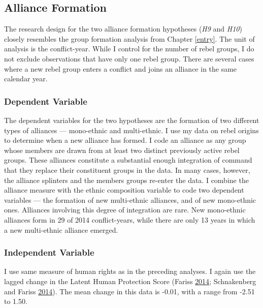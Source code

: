\documentclass[12pt,]{book}
\theoremstyle{definition}
\theoremstyle{definition}
\theoremstyle{definition}
\theoremstyle{remark}
\begin{document}
\hypertarget{alliance-formation-2}{%
\subsection{Alliance Formation}\label{alliance-formation-2}}

The research design for the two alliance formation hypotheses (\emph{H9}
and \emph{H10}) closely resembles the group formation analysis from
Chapter \ref{entry}. The unit of analysis is the conflict-year. While I
control for the number of rebel groups, I do not exclude observations
that have only one rebel group. There are several cases where a new
rebel group enters a conflict and joins an alliance in the same calendar
year.

\hypertarget{dependent-variable}{%
\subsubsection*{Dependent Variable}\label{dependent-variable}}

The dependent variables for the two hypotheses are the formation of two
different types of alliances --- mono-ethnic and multi-ethnic. I use my
data on rebel origins to determine when a new alliance has formed. I
code an alliance as any group whose members are drawn from at least two
distinct previously active rebel groups. These alliances constitute a
substantial enough integration of command that they replace their
constituent groups in the data. In many cases, however, the alliance
splinters and the members groups re-enter the data. I combine the
alliance measure with the ethnic composition variable to code two
dependent variables --- the formation of new multi-ethnic alliances, and
of new mono-ethnic ones. Alliances involving this degree of integration
are rare. New mono-ethnic alliances form in 29 of 2014 conflict-years,
while there are only 13 years in which a new multi-ethnic alliance
emerged.

\hypertarget{independent-variable}{%
\subsubsection*{Independent Variable}\label{independent-variable}}

I use same measure of human rights as in the preceding analyses. I again
use the lagged change in the Latent Human Protection Score (Fariss
\protect\hyperlink{ref-Fariss2014}{2014}; Schnakenberg and Fariss
\protect\hyperlink{ref-Schnakenberg2014}{2014}). The mean change in this
data is -0.01, with a range from -2.51 to 1.50.
\end{document}
